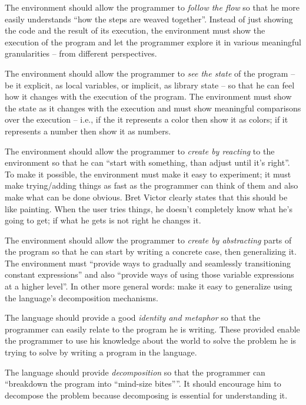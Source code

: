 \documentclass{./llncs2e/llncs}
\begin{document}
	The environment should allow the programmer to \emph{follow the flow} so that he more easily understands ``how the steps are weaved together''. 
	Instead of just showing the code and the result of its execution, the environment must show the execution of the program and let the programmer explore it in various meaningful granularities -- from different perspectives.

	The environment should allow the programmer to \emph{see the state} of the program -- be it explicit, as local variables, or implicit, as library state -- so that he can feel how it changes with the execution of the program. 
	The environment must show the state as it changes with the execution and must show meaningful comparisons over the execution -- i.e., if the it represents a color then show it as colors; if it represents a number then show it as numbers.

	The environment should allow the programmer to \emph{create by reacting} to the environment so that he can ``start with something, than adjust until it's right''. 
	To make it possible, the environment must make it easy to experiment; it must make trying/adding things as fast as the programmer can think of them and also make what can be done obvious. 
	Bret Victor clearly states that this should be like painting. 
	When the user tries things, he doesn't completely know what he's going to get; if what he gets is not right he changes it.

	The environment should allow the programmer to \emph{create by abstracting} parts of the program so that he can start by writing a concrete case, then generalizing it. 
	The environment must ``provide ways to gradually and seamlessly transitioning constant expressions'' and also ``provide ways of using those variable expressions at a higher level''. 
	In other more general words: make it easy to generalize using the language's decomposition mechanisms. 

	The language should provide a good \emph{identity and metaphor} so that the programmer can easily relate to the program he is writing. 
	These provided enable the programmer to use his knowledge about the world to solve the problem he is trying to solve by writing a program in the language. 

	The language should provide \emph{decomposition} so that the programmer can ``breakdown the program into ``mind-size bites''''. 
	It should encourage him to decompose the problem because decomposing is essential for understanding it.
\end{document}
